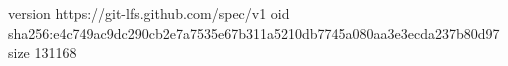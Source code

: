 version https://git-lfs.github.com/spec/v1
oid sha256:e4c749ac9dc290cb2e7a7535e67b311a5210db7745a080aa3e3ecda237b80d97
size 131168
